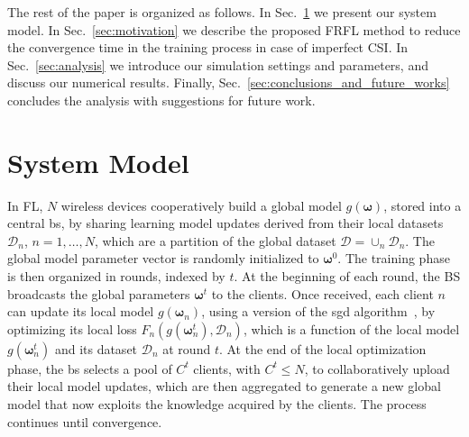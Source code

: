 \documentclass[10pt, conference, letterpaper]{IEEEtran}
\begin{document}
	The rest of the paper is organized as follows. 
	In Sec.~\ref{sec:problem} we present our system model.
	In Sec.~\ref{sec:motivation} we describe the proposed FRFL method to reduce the convergence time in the training process in case of imperfect CSI.
	In Sec.~\ref{sec:analysis} we introduce our simulation settings and parameters, and discuss our numerical results. 
	Finally, Sec.~\ref{sec:conclusions_and_future_works} concludes the analysis with suggestions for future work.
	
	
	\section{System Model}
	\label{sec:problem}
	In FL, $N$ wireless devices cooperatively build a global model $g(\bm{\omega})$, stored into a central \gls{bs}, by sharing learning model updates derived from their local datasets $\mathcal{D}_n$, $n = 1, \dots, N$, which are a partition of the global dataset ${\mathcal{D} = \cup_n \mathcal{D}_n}$.
	The global model parameter vector is randomly initialized to $\bm{\omega}^0$. The training phase is then organized in rounds, indexed by $t$. 
	At the beginning of each round, the BS broadcasts the global parameters $\bm{\omega}^t$ to the clients. 
	Once received, each client $n$ can update its local model $g(\bm{\omega}_n)$, using a version of the \gls{sgd} algorithm~\cite{BrendanMcMahan2017}, by optimizing its local loss $F_n(g(\bm{\omega}_n^t), \mathcal{D}_n)$, which is a function of the local model $g(\bm{\omega}_n^t)$ and its dataset $\mathcal{D}_n$ at round $t$.
	At the end of the local optimization phase, the \gls{bs} selects a pool of $C^t$ clients, with $C^t \leq N$, to collaboratively upload their local model updates, which are then aggregated to generate a new global model that now exploits the knowledge acquired by the clients. The process continues until convergence.
	
\end{document}
